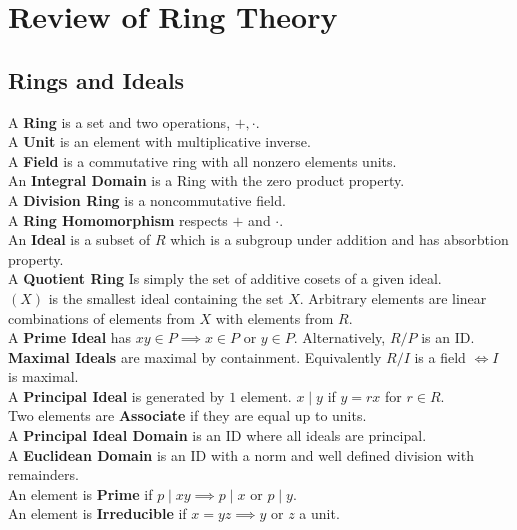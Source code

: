 \section{Review of Ring Theory}
\subsection{Rings and Ideals}
\begin{definition}[Rings]
	A \textbf{Ring} is a set and two operations, \(+, \cdot\).\\
	A \textbf{Unit} is an element with multiplicative inverse.\\
	A \textbf{Field} is a commutative ring with all nonzero elements units.\\
	An \textbf{Integral Domain} is a Ring with the zero product property.\\
	A \textbf{Division Ring} is a noncommutative field.\\
	A \textbf{Ring Homomorphism} respects \(+\) and \(\cdot\).\\
	An \textbf{Ideal} is a subset of \(R\) which is a subgroup under addition and has absorbtion property.\\
	A \textbf{Quotient Ring} Is simply the set of additive cosets of a given ideal.\\
	\(\left( X \right) \) is the smallest ideal containing the set \(X\). Arbitrary elements are linear combinations of elements from \(X\) with elements from \(R\).\\
	A \textbf{Prime Ideal} has \(xy \in P \implies x \in P \text{ or } y \in P\). Alternatively, \(R / P\) is an ID.\\
	\textbf{Maximal Ideals} are maximal by containment. Equivalently \(R / I\) is a field \(\iff I\)  is maximal.\\
	A \textbf{Principal Ideal} is generated by \(1\) element.
	\(x \mid y\) if \(y = rx\) for \(r \in R\).\\
	Two elements are \textbf{Associate} if they are equal up to units.\\
	A \textbf{Principal Ideal Domain} is an ID where all ideals are principal.\\
	A \textbf{Euclidean Domain} is an ID with a norm and well defined division with remainders.\\
	An element is \textbf{Prime} if \(p \mid xy \implies p \mid x \text{ or } p \mid y\).\\
	An element is \textbf{Irreducible} if \(x = yz \implies y\) or \(z\) a unit.\\

\end{definition}
